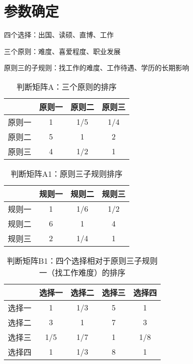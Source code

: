 \documentclass[UTF8]{ctexart}
\begin{document}
\section{参数确定}
四个选择：出国、读硕、直博、工作\par
三个原则：难度、喜爱程度、职业发展\par
原则三的子规则：找工作的难度、工作待遇、学历的长期影响\par
\begin{table}[!hbp]
\centering
\begin{tabular}{|c|c|c|c|}
\hline
\hline
 & 原则一 & 原则二 & 原则三 \\
\hline
原则一 & 1 & 1/5 & 1/4 \\
\hline
原则二 & 5 & 1 & 2 \\
\hline
原则三 & 4 & 1/2 & 1 \\
\hline
\end{tabular}
\caption{判断矩阵A：三个原则的排序}
\vspace{4mm}
\end{table}
\begin{table}[!hbp]
\centering
\begin{tabular}{|c|c|c|c|}
\hline
\hline
      & 规则一 & 规则二 & 规则三 \\
\hline
规则一 & 1     & 1/6   & 1/2   \\
\hline
规则二 & 6     & 1     & 4     \\
\hline
规则三 & 2     & 1/4   & 1     \\
\hline
\end{tabular}
\caption{判断矩阵A1：原则三子规则排序}
\vspace{4mm}
\end{table}
\begin{table}[!hbp]
\centering
\begin{tabular}{|c|c|c|c|c|}
\hline
\hline
      & 选择一 & 选择二 & 选择三 & 选择四 \\
\hline
选择一 & 1     & 1/3   & 5     & 1     \\
\hline
选择二 & 3     & 1     & 7     & 3     \\
\hline
选择三 & 1/5   & 1/7   & 1     & 1/8   \\
\hline
选择四 & 1     & 1/3   & 8     & 1     \\
\hline
\end{tabular}
\caption{判断矩阵B1：四个选择相对于原则三子规则一（找工作难度）的排序}
\vspace{4mm}
\end{table}
\end{document}
